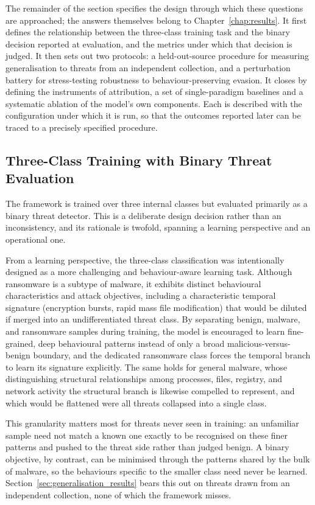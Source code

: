 \documentclass[%
    BCOR=10mm,
    DIV=13,
    toc=bibliography,
    toc=listof,
    oneside,
    12pt,
]{scrbook}
\begin{document}
The remainder of the section specifies the design through which these questions
are approached; the answers themselves belong to Chapter~\ref{chap:results}. It
first defines the relationship between the three-class training task and the
binary decision reported at evaluation, and the metrics under which that
decision is judged. It then sets out two protocols: a held-out-source procedure
for measuring generalisation to threats from an independent collection, and a
perturbation battery for stress-testing robustness to behaviour-preserving
evasion. It closes
by defining the instruments of attribution, a set of single-paradigm baselines
and a systematic ablation of the model's own components. Each is described with
the configuration under which it is run, so that the outcomes reported later can
be traced to a precisely specified procedure.

\subsection{Three-Class Training with Binary Threat Evaluation}
\label{subsec:binary_projection}

The framework is trained over three internal classes but evaluated primarily
as a binary threat detector. This is a deliberate design decision rather than
an inconsistency, and its rationale is twofold, spanning a learning perspective
and an operational one.

From a learning perspective, the three-class classification was intentionally
designed as a more challenging and behaviour-aware learning task. Although
ransomware is a subtype of malware, it exhibits distinct behavioural
characteristics and attack objectives, including a characteristic temporal
signature (encryption bursts, rapid mass file modification) that would be
diluted if merged into an undifferentiated threat class. By separating benign,
malware, and ransomware samples during training, the model is encouraged to
learn fine-grained, deep behavioural patterns instead of only a broad
malicious-versus-benign boundary, and the dedicated ransomware class forces the
temporal branch to learn its signature explicitly. The same holds for general
malware, whose distinguishing structural relationships among processes, files,
registry, and network activity the structural branch is likewise compelled to
represent, and which would be flattened were all threats collapsed into a
single class.

This granularity matters most for threats never seen in training: an unfamiliar
sample need not match a known one exactly to be recognised on these finer
patterns and pushed to the threat side rather than judged benign. A binary
objective, by contrast, can be minimised through the patterns shared by the bulk
of malware, so the behaviours specific to the smaller class need never be
learned. Section~\ref{sec:generalisation_results} bears this out on threats
drawn from an independent collection, none of which the framework misses.
\end{document}
